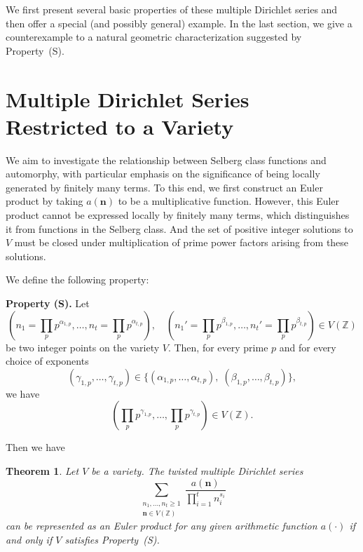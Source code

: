 \documentclass[12pt,reqno]{amsart}
\numberwithin{equation}{section}
\theoremstyle{plain}
\newtheorem{theorem}{Theorem}[section]
\theoremstyle{definition}
\theoremstyle{remark}
\newcommand{\propertyS}[1]{%
  \par\noindent\textbf{Property (S).} #1 \par
}
\begin{document}
We first present several basic properties of these multiple Dirichlet series and then offer a special (and possibly general) example. In the last section, we give a counterexample to a natural geometric characterization suggested by Property~(S).


\section{Multiple Dirichlet Series Restricted to a Variety}

We aim to investigate the relationship between Selberg class functions and automorphy, with particular emphasis on the significance of being locally generated by finitely many terms.
To this end, we first construct an Euler product by taking \( a(\boldsymbol{n}) \) to be a multiplicative function. However, this Euler product cannot be expressed locally by finitely many terms, which distinguishes it from functions in the Selberg class.
And the set of positive integer solutions to \( V \) must be closed under multiplication of prime power factors arising from these solutions.

We define the following property:

\propertyS{
Let
\[
(n_1 = \prod_p p^{\alpha_{1,p}}, \dots, n_t = \prod_p p^{\alpha_{t,p}}), \quad
(n_1' = \prod_p p^{\beta_{1,p}}, \dots, n_t' = \prod_p p^{\beta_{t,p}}) \in V(\mathbb{Z})
\]
be two integer points on the variety \( V \). Then, for every prime \( p \) and for every choice of exponents
\[
(\gamma_{1,p}, \dots, \gamma_{t,p}) \in \{ (\alpha_{1,p}, \dots, \alpha_{t,p}),\; (\beta_{1,p}, \dots, \beta_{t,p}) \},
\]
we have
\[
\left( \prod_p p^{\gamma_{1,p}}, \dots, \prod_p p^{\gamma_{t,p}} \right) \in V(\mathbb{Z}).
\]
}

Then we have
\begin{theorem}
Let $V$ be a variety. The twisted multiple Dirichlet series
\begin{equation}\label{eqn:wtDs}
\sum_{\substack{n_1,\dots,n_t \geq 1 \\ \boldsymbol{n} \in V(\mathbb{Z})}}
\frac{a(\boldsymbol{n})}{\prod_{i=1}^{t} n_i^{s_i}}
\end{equation}
can be represented as an Euler product for any given arithmetic function $a(\boldsymbol{\cdot})$ if and only if $V$ satisfies Property~(S).
\end{theorem}
\end{document}
